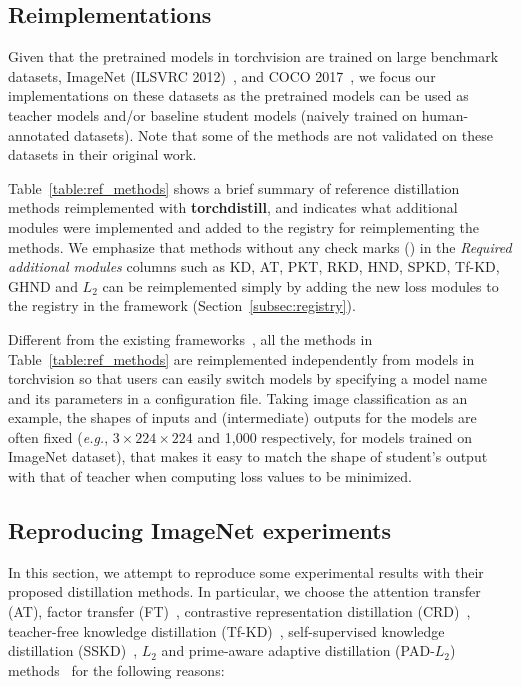 \documentclass[runningheads]{llncs}
\newcommand{\FRAMEWORK}{{\bf torchdistill}\xspace}
\begin{document}
\subsection{Reimplementations}
\label{subsec:reimplementations}
Given that the pretrained models in torchvision are trained on large benchmark datasets, ImageNet (ILSVRC 2012)~\cite{russakovsky2015imagenet}, and COCO 2017~\cite{lin2014microsoft}, we focus our implementations on these datasets as the pretrained models can be used as teacher models and/or baseline student models (naively trained on human-annotated datasets).
Note that some of the methods are not validated on these datasets in their original work.

Table~\ref{table:ref_methods} shows a brief summary of reference distillation methods reimplemented with \FRAMEWORK, and indicates what additional modules were implemented and added to the registry for reimplementing the methods.
We emphasize that methods without any check marks (\checkmark) in the \emph{Required additional modules} columns such as KD, AT, PKT, RKD, HND, SPKD, Tf-KD, GHND and $L_2$ can be reimplemented simply by adding the new loss modules to the registry in the framework (Section~\ref{subsec:registry}).

Different from the existing frameworks~\cite{zagoruyko2017paying,passalis2018learning,heo2019knowledge,park2019relational,tian2020contrastive,xu2020knowledge}, all the methods in Table~\ref{table:ref_methods} are reimplemented independently from models in torchvision so that users can easily switch models by specifying a model name and its parameters in a configuration file.
Taking image classification as an example, the shapes of inputs and (intermediate) outputs for the models are often fixed (\emph{e.g.}, $3 \times 224 \times 224$ and 1,000 respectively, for models trained on ImageNet dataset), that makes it easy to match the shape of student's output with that of teacher when computing loss values to be minimized.



\subsection{Reproducing ImageNet experiments}
\label{subsec:imagenet_experiments}
In this section, we attempt to reproduce some experimental results with their proposed distillation methods.
In particular, we choose the attention transfer (AT), factor transfer (FT)~\cite{kim2018paraphrasing}, contrastive representation distillation (CRD)~\cite{tian2020contrastive}, teacher-free knowledge distillation (Tf-KD)~\cite{yuan2020revisiting}, self-supervised knowledge distillation (SSKD)~\cite{xu2020knowledge}, $L_2$ and prime-aware adaptive distillation (PAD-$L_2$) methods~\cite{zhang2020prime} for the following reasons:
\end{document}
